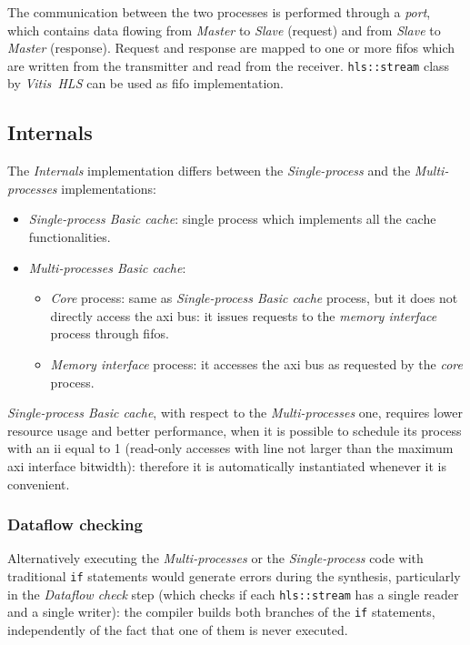 \documentclass[11pt,a4paper,oneside]{memoir}
\begin{document}
The communication between the two processes is performed through a \emph{port},
which contains data flowing from \emph{Master} to \emph{Slave} (request) and
from \emph{Slave} to \emph{Master} (response).
Request and response are mapped to one or more \acp{fifo} which are written
from the transmitter and read from the receiver.
\texttt{hls::stream} class by \emph{Vitis\texttrademark~HLS} can be used as
\ac{fifo} implementation.

\subsection{Internals}
The \emph{Internals} implementation differs between the \emph{Single-process}
and the \emph{Multi-processes} implementations:
\begin{itemize}
	\item \emph{Single-process Basic cache}: single process which
		implements all the cache functionalities.
	\item \emph{Multi-processes Basic cache}:
		\begin{itemize}
			\item \emph{Core} process: same as \emph{Single-process
				Basic cache} process, but it does not
				directly access the \ac{axi} bus: it issues
				requests to the \emph{memory interface} process
				through \acp{fifo}.
			\item \emph{Memory interface} process: it accesses the
				\ac{axi} bus as requested by the \emph{core}
				process.
		\end{itemize}
\end{itemize}

\emph{Single-process Basic cache}, with respect to the \emph{Multi-processes}
one, requires lower resource usage and better performance, when it is possible
to schedule its process with an \ac{ii} equal to 1 (read-only accesses with
line not larger than the maximum \ac{axi} interface bitwidth): therefore it is
automatically instantiated whenever it is convenient.

\subsubsection{Dataflow checking}
Alternatively executing the \emph{Multi-processes} or the \emph{Single-process}
code with traditional \texttt{if} statements would generate errors during the
synthesis, particularly in the \emph{Dataflow check} step (which checks if each
\texttt{hls::stream} has a single reader and a single writer): the compiler
builds both branches of the \texttt{if} statements, independently of the fact
that one of them is never executed.
\end{document}
